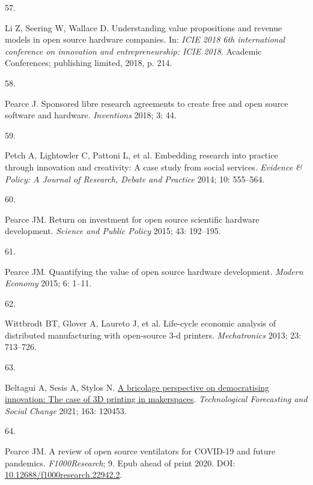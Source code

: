 \documentclass[
  12pt,
  a4paperpaper,
  onecolumn]{article}
\newlength{\cslhangindent}
\newlength{\csllabelwidth}
\newlength{\cslentryspacingunit} %
\newenvironment{CSLReferences}[2] %
 {%
  \setlength{\parindent}{0pt}
  \ifodd #1
  \let\oldpar\par
  \def\par{\hangindent=\cslhangindent\oldpar}
  \fi
  \setlength{\parskip}{#2\cslentryspacingunit}
 }%
 {}
\newcommand{\CSLLeftMargin}[1]{\parbox[t]{\csllabelwidth}{#1}}
\newcommand{\CSLRightInline}[1]{\parbox[t]{\linewidth - \csllabelwidth}{#1}\break}
\begin{document}
\begin{CSLReferences}{0}{0}
\leavevmode{}%
\CSLLeftMargin{57. }%
\CSLRightInline{Li Z, Seering W, Wallace D. Understanding value
propositions and revenue models in open source hardware companies. In:
\emph{ICIE 2018 6th international conference on innovation and
entrepreneurship: ICIE 2018}. Academic Conferences; publishing limited,
2018, p. 214.}

\leavevmode{}%
\CSLLeftMargin{58. }%
\CSLRightInline{Pearce J. Sponsored libre research agreements to create
free and open source software and hardware. \emph{Inventions} 2018; 3:
44.}

\leavevmode{}%
\CSLLeftMargin{59. }%
\CSLRightInline{Petch A, Lightowler C, Pattoni L, et al. Embedding
research into practice through innovation and creativity: A case study
from social services. \emph{Evidence \& Policy: A Journal of Research,
Debate and Practice} 2014; 10: 555--564.}

\leavevmode{}%
\CSLLeftMargin{60. }%
\CSLRightInline{Pearce JM. Return on investment for open source
scientific hardware development. \emph{Science and Public Policy} 2015;
43: 192--195.}

\leavevmode{}%
\CSLLeftMargin{61. }%
\CSLRightInline{Pearce JM. Quantifying the value of open source hardware
development. \emph{Modern Economy} 2015; 6: 1--11.}

\leavevmode{}%
\CSLLeftMargin{62. }%
\CSLRightInline{Wittbrodt BT, Glover A, Laureto J, et al. Life-cycle
economic analysis of distributed manufacturing with open-source 3-d
printers. \emph{Mechatronics} 2013; 23: 713--726.}

\leavevmode{}%
\CSLLeftMargin{63. }%
\CSLRightInline{Beltagui A, Sesis A, Stylos N.
\href{https://doi.org/10.1016/j.techfore.2020.120453}{A bricolage
perspective on democratising innovation: {The} case of {3D} printing in
makerspaces}. \emph{Technological Forecasting and Social Change} 2021;
163: 120453.}

\leavevmode{}%
\CSLLeftMargin{64. }%
\CSLRightInline{Pearce JM. A review of open source ventilators for
{COVID-19} and future pandemics. \emph{F1000Research}; 9. Epub ahead of
print 2020. DOI:
\href{https://doi.org/10.12688/f1000research.22942.2}{10.12688/f1000research.22942.2}.}


\end{CSLReferences}
\end{document}
